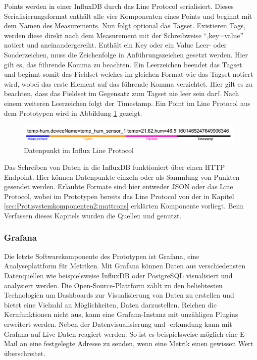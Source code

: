 Points werden in einer InfluxDB durch das Line Protocol serialisiert. Dieses Serialisierungsformat enthält alle vier Komponenten eines Points und beginnt mit dem Namen des Measurements. Nun folgt optional das Tagset. Existieren Tags, werden diese direkt nach dem Measurement mit der Schreibweise ``,key=value'' notiert und aneinandergereiht. Enthält ein Key oder ein Value Leer- oder Sonderzeichen, muss die Zeichenfolge in Anführungszeichen gesetzt werden. Hier gilt es, das führende Komma zu beachten. Ein Leerzeichen beendet das Tagset und beginnt somit das Fieldset welches im gleichen Format wie das Tagset notiert wird, wobei das erste Element auf das führende Komma verzichtet. Hier gilt es zu beachten, dass das Fieldset im Gegensatz zum Tagset nie leer sein darf. Nach einem weiteren Leerzeichen folgt der Timestamp. Ein Point im Line Protocol aus dem Prototypen wird in Abbildung \ref{fig:lineprotocol} gezeigt.

\begin{figure}[H]
  \vspace{10pt}
  \begin{center}
    \includegraphics[width=1.0\textwidth]{./images/LineProtocol.jpg}
  \end{center}
  \vspace{-5pt}
  \caption[Datenpunkt im Influx Line Protocol]{Datenpunkt im Influx Line Protocol}
  \label{fig:lineprotocol}
  \vspace{-10pt}
\end{figure}

Das Schreiben von Daten in die InfluxDB funktioniert über einen HTTP Endpoint. Hier können Datenpunkte einzeln oder als Sammlung von Punkten gesendet werden. Erlaubte Formate sind hier entweder JSON oder das Line Protocol, wobei im Prototypen bereits das Line Protocol von der in Kapitel \ref{sec:Prot:systemkomponenten2:mqttcons} erklärten Komponente vorliegt. Beim Verfassen dieses Kapitels wurden die Quellen \cite{TimeSeriesInflux.2020} und \cite{InfluxInternals.2017} genutzt.

 
\subsubsection{Grafana}

Die letzte Softwarekomponente des Prototypen ist Grafana, eine Analyseplattform für Metriken. Mit Grafana können Daten aus verschiedensten Datenquellen wie beispielsweise InfluxDB oder PostgreSQL visualisiert und analysiert werden. Die Open-Source-Plattform zählt zu den beliebtesten Technologien um Dashboards zur Visualisierung von Daten zu erstellen und bietet eine Vielzahl an Möglichkeiten, Daten darzustellen. Reichen die Kernfunktionen nicht aus, kann eine Grafana-Instanz mit unzähligen Plugins erweitert werden. Neben der Datenvisualisierung und -erkundung kann mit Grafana auf Live-Daten reagiert werden. So ist es beispielsweise möglich eine E-Mail an eine festgelegte Adresse zu senden, wenn eine Metrik einen gewissen Wert überschreitet. 

